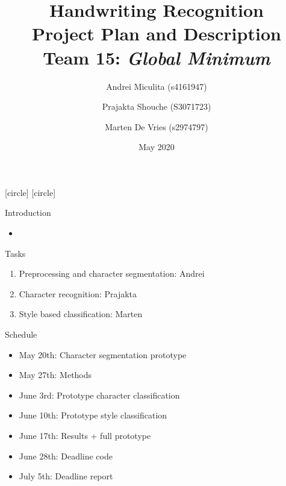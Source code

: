 \documentclass[table]{beamer}
\title{Handwriting Recognition\\
Project Plan and Description\\
Team 15: \textit{Global Minimum}}
\author{Andrei Miculita (s4161947) \and Prajakta Shouche (S3071723) \and Marten De Vries (s2974797)}
\institute{University of Groningen}
\date{May 2020}
\begin{document}
[circle]
[circle]

\frame{\titlepage}

\begin{frame}{Introduction}
    \begin{itemize}
        \item 
    \end{itemize}
\end{frame}

\begin{frame}{Tasks}
    \begin{enumerate}
        \item Preprocessing and character segmentation: Andrei
        \item Character recognition: Prajakta
        \item Style based classification: Marten
    \end{enumerate}
\end{frame}

\begin{frame}{Schedule}
    \begin{itemize}
        \item May 20th: Character segmentation prototype
        \item May 27th: Methods
        \item June 3rd: Prototype character classification
        \item June 10th: Prototype style classification
        \item June 17th: Results + full prototype
        \item June 28th: Deadline code
        \item July 5th: Deadline report
    \end{itemize}
\end{frame}
\end{document}
